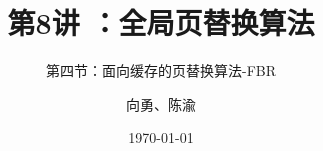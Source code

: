 



\title[第8讲]{第8讲 ：全局页替换算法} %
\subtitle{第四节：面向缓存的页替换算法-FBR}
\author{向勇、陈渝} %
\date{\today} %




\begin{frame}
\titlepage %
\end{frame}

